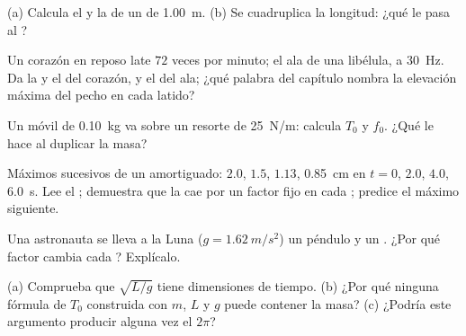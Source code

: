 \begin{exercise}[$\star$]\label{exo:g12:oscillators-and-time:1}
(a) Calcula el  y la  de un  de \qty{1.00}{m}. (b) Se
cuadruplica la longitud: ¿qué le pasa al ?
\end{exercise}

\begin{exercise}[$\star$]\label{exo:g12:oscillators-and-time:2}
Un corazón en reposo late $72$ veces por minuto; el ala de una libélula, a
\qty{30}{Hz}. Da la  y el  del corazón, y el  del ala; ¿qué
palabra del capítulo nombra la elevación máxima del pecho en cada latido?
\end{exercise}

\begin{exercise}[$\star$]\label{exo:g12:oscillators-and-time:3}
Un móvil de \qty{0.10}{kg} va sobre un resorte de \qty{25}{N/m}: calcula $T_0$ y
$f_0$. ¿Qué le hace al  duplicar la masa?
\end{exercise}

\begin{exercise}[$\star$]\label{exo:g12:oscillators-and-time:4}
Máximos sucesivos de un  amortiguado: $2.0$, $1.5$, $1.13$, \qty{0.85}{cm} en
$t = 0$, $2.0$, $4.0$, \qty{6.0}{s}. Lee el ; demuestra que la 
cae por un factor fijo en cada ; predice el máximo siguiente.
\end{exercise}

\begin{exercise}[$\star$]\label{exo:g12:oscillators-and-time:5}
Una astronauta se lleva a la Luna ($g = \qty{1.62}{m/s^2}$) un péndulo y un . ¿Por qué factor cambia cada ? Explícalo.
\end{exercise}

\begin{exercise}[$\star\star$]\label{exo:g12:oscillators-and-time:6}
(a) Comprueba que $\sqrt{L/g}$ tiene dimensiones de tiempo. (b) ¿Por qué ninguna
fórmula de $T_0$ construida con $m$, $L$ y $g$ puede contener la masa? (c) ¿Podría
este argumento producir alguna vez el $2\pi$?
\end{exercise}

